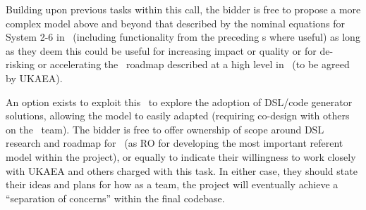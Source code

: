 Building upon previous tasks within this call, the bidder is free to propose a 
more complex model above and beyond that described by the nominal equations for 
System 2-6 in~\cite{pappeqs} (including functionality from the preceding \Papp s where useful) 
as long as they deem this could be useful for increasing impact or quality or for 
de-risking or accelerating the \nep \   roadmap described at a high level in~\cite{sciplan} 
(to be agreed by UKAEA).

An option exists to exploit this \Papp \ to explore the adoption of DSL/code generator 
solutions, allowing the model to easily adapted (requiring co-design with others 
on the \nep \   team). The bidder is free to offer ownership of scope around DSL 
research and roadmap for \nep \   (as RO for developing the most important referent 
model within the project), or equally to indicate their willingness to work closely 
with UKAEA and others charged with this task. In either case, they should state 
their ideas and plans for how as a team, the project will eventually achieve a 
``separation of concerns'' within the final codebase. 

